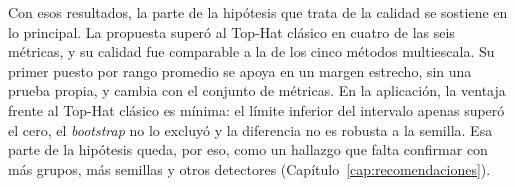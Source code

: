 Con esos resultados, la parte de la hipótesis que trata de la calidad se sostiene en lo principal. La
propuesta superó al Top-Hat clásico en cuatro de las seis métricas, y su calidad fue comparable a la de los cinco
métodos multiescala. Su primer puesto por rango promedio se apoya en un margen estrecho, sin una prueba
propia, y cambia con el conjunto de métricas. En la aplicación, la ventaja frente al Top-Hat clásico es
mínima: el límite inferior del intervalo apenas superó el cero, el \textit{bootstrap} no lo excluyó y
la diferencia no es robusta a la semilla. Esa parte de la hipótesis queda, por eso, como un hallazgo que falta confirmar con más grupos,
más semillas y otros detectores (Capítulo~\ref{cap:recomendaciones}).
